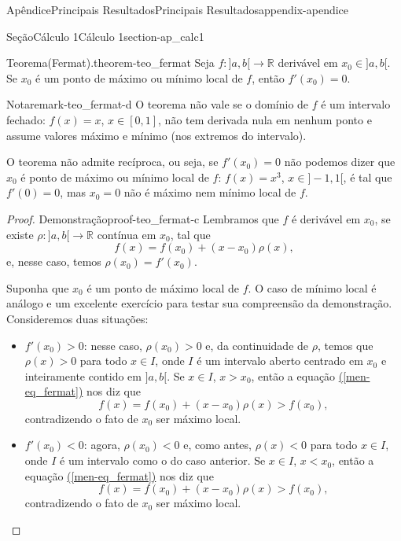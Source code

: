 \documentclass[oneside,10pt,]{book}
\newcommand{\xreffont}{\relax}
\numberwithin{equation}{section}
\newcommand{\R}{\mathbb R}
\begin{document}
\begin{appendixptx}{Apêndice}{Principais Resultados}{}{Principais Resultados}{}{}{appendix-apendice}
\begin{sectionptx}{Seção}{Cálculo 1}{}{Cálculo 1}{}{}{section-ap_calc1}
\begin{theorem}{Teorema}{(Fermat).}{}{theorem-teo_fermat}
Seja \(f\colon ]a,b[\to\R\) derivável em \(x_0\in
]a,b[\). Se \(x_0\) é um ponto de máximo ou mínimo local de \(f\), então \(f'(x_0)=0\).%
\begin{remark}{Nota}{}{remark-teo_fermat-d}%
O teorema não vale se o domínio de \(f\) é um intervalo fechado: \(f(x)=x\), \(x\in [0,1]\), não tem derivada nula em nenhum ponto e assume valores máximo e mínimo (nos extremos do intervalo).%
\par
O teorema não admite recíproca, ou seja, se \(f'(x_0)=0\) não podemos dizer que \(x_0\) é ponto de máximo ou mínimo local de \(f\): \(f(x)=x^3\), \(x\in ]-1,1[\), é tal que \(f'(0)=0\), mas \(x_0=0\) não é máximo nem mínimo local de \(f\).%
\end{remark}
\end{theorem}
\begin{proof}{Demonstração}{}{proof-teo_fermat-c}
Lembramos que \(f\) é derivável em \(x_0\), se existe \(\rho\colon ]a,b[\to\R\) contínua em \(x_0\), tal que%
\begin{equation}
f(x)=f(x_0)+(x-x_0)\rho(x),\label{men-eq_fermat}
\end{equation}
e, nesse caso, temos \(\rho(x_0)=f'(x_0)\).%
\par
Suponha que \(x_0\) é um ponto de máximo local de \(f\). O caso de mínimo local é análogo e um excelente exercício para testar sua compreensão da demonstração. Consideremos duas situações:%
\begin{itemize}[label=\textbullet]
\item{}\(f'(x_0)>0\): nesse caso, \(\rho(x_0)>0\) e, da continuidade de \(\rho\), temos que \(\rho(x)>0\) para todo \(x\in I\), onde \(I\) é um intervalo aberto centrado em \(x_0\) e inteiramente contido em \(]a,b[\). Se \(x\in
I\), \(x>x_0\), então a equação \hyperref[men-eq_fermat]{({\xreffont\ref{men-eq_fermat}})} nos diz que%
\begin{equation*}
f(x)=f(x_0)+(x-x_0)\rho(x)>f(x_0),
\end{equation*}
contradizendo o fato de \(x_0\) ser máximo local.%
\item{}\(f'(x_0)<0\): agora, \(\rho(x_0)<0\) e, como antes, \(\rho(x)<0\) para todo \(x\in I\), onde \(I\) é um intervalo como o do caso anterior. Se \(x\in I\), \(x<x_0\), então a equação \hyperref[men-eq_fermat]{({\xreffont\ref{men-eq_fermat}})} nos diz que%
\begin{equation*}
f(x)=f(x_0)+(x-x_0)\rho(x)>f(x_0),
\end{equation*}
contradizendo o fato de \(x_0\) ser máximo local.%

\end{itemize}
\end{proof}
\end{sectionptx}
\end{appendixptx}
\end{document}
